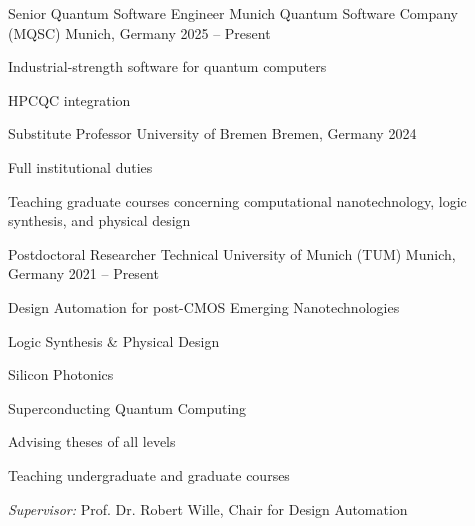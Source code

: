 

\begin{cventries}

  \cventry
    {Senior Quantum Software Engineer} %
    {Munich Quantum Software Company (MQSC)} %
    {Munich, Germany} %
    {2025 -- Present} %
    {
      \begin{cvitems} %
        \item {Industrial-strength software for quantum computers}
        \item {HPCQC integration}
      \end{cvitems}
    }

  \cventry
    {Substitute Professor} %
    {University of Bremen} %
    {Bremen, Germany} %
    {2024} %
    {
      \begin{cvitems} %
      	\item Full institutional duties
        \item Teaching graduate courses concerning computational nanotechnology, logic synthesis, and physical design
      \end{cvitems}
    }

  \cventry
    {Postdoctoral Researcher} %
    {Technical University of Munich (TUM)} %
    {Munich, Germany} %
    {2021 -- Present} %
    {
      \begin{cvitems} %
        \item {Design Automation for post-CMOS Emerging Nanotechnologies}
        \item {Logic Synthesis \& Physical Design}
        \item {Silicon Photonics}
        \item {Superconducting Quantum Computing}
        \item {Advising theses of all levels}
        \item {Teaching undergraduate and graduate courses}
        \item {\emph{Supervisor:} Prof. Dr. Robert Wille, Chair for Design Automation}
      \end{cvitems}
    }


\end{cventries}
